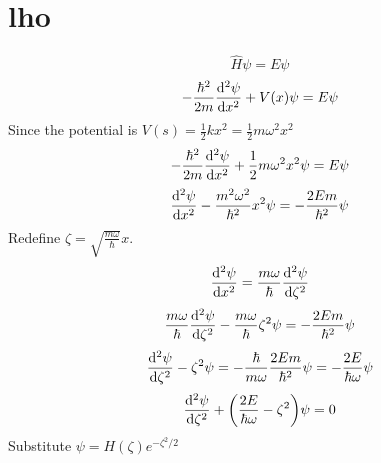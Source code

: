 \documentclass[12pt]{article}
\begin{document}
\section{lho}

\[\hat{H}\psi=E\psi\]
\[-\frac{\hbar^2}{2m}\dv[2]{\psi}{x}+V(x)\psi=E\psi\]
Since the potential is $V(s)=\frac{1}{2}kx^2=\frac{1}{2}m\omega^2x^2$
\[-\frac{\hbar^2}{2m}\dv[2]{\psi}{x}+\frac{1}{2}m\omega^2x^2\psi=E\psi\]
\[\dv[2]{\psi}{x}-\frac{m^2\omega^2}{\hbar^2}x^2\psi=-\frac{2Em}{\hbar^2}\psi\]
Redefine $\zeta=\sqrt{\frac{m\omega}{\hbar}}x$.
\[\dv[2]{\psi}{x}=\frac{m\omega}{\hbar}\dv[2]{\psi}{\zeta}\]
\[\frac{m\omega}{\hbar}\dv[2]{\psi}{\zeta}-\frac{m\omega}{\hbar}\zeta^2\psi=-\frac{2Em}{\hbar^2}\psi\]
\[\dv[2]{\psi}{\zeta}-\zeta^2\psi=-\frac{\hbar}{m\omega}\frac{2Em}{\hbar^2}\psi=-\frac{2E}{\hbar\omega}\psi\]
\[\dv[2]{\psi}{\zeta}+\qty(\frac{2E}{\hbar\omega}-\zeta^2)\psi=0\]
Substitute $\psi=H(\zeta)e^{-\zeta^2/2}$	
\end{document}
